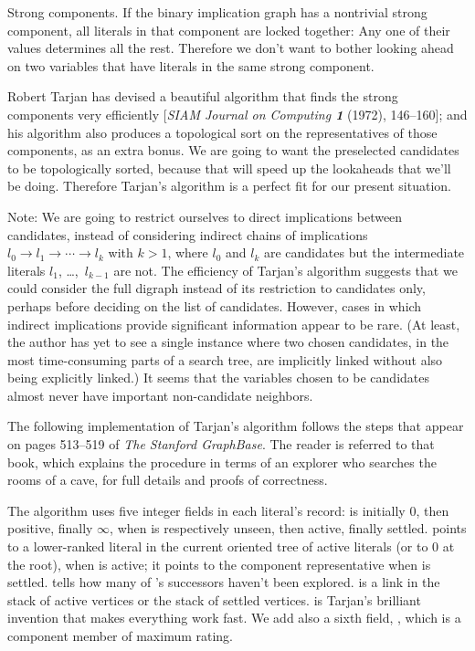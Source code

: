 Strong components. If the binary implication graph has
a nontrivial
strong component, all literals in that component are locked together:
Any one of their values determines all the rest. Therefore we don't want
to bother looking ahead on two variables that have literals in the
same strong component.

Robert Tarjan has devised a beautiful algorithm that finds the strong
components very efficiently [{\sl SIAM Journal on Computing\/ \bf1} (1972),
146--160]; and his algorithm also produces a topological sort on the
representatives of those components, as an extra bonus. We are going to want
the preselected candidates to be topologically sorted, because that will speed
up the lookaheads that we'll be doing. Therefore Tarjan's algorithm
is a perfect fit for our present situation.

Note: We are going to restrict ourselves to direct implications between
candidates, instead of considering indirect chains of implications
$l_0\to l_1\to \cdots\to l_k$ with $k>1$,
where $l_0$ and $l_k$ are candidates but the intermediate literals
$l_1$, \dots,~$l_{k-1}$ are not. The efficiency of Tarjan's algorithm
suggests that we could consider the full digraph instead of its
restriction to candidates only, perhaps before deciding on the
list of candidates. However, cases in which indirect implications provide
significant information appear to be rare. (At least, the author has yet
to see a single instance where two chosen candidates, in the most
time-consuming parts of a search tree, are implicitly linked without
also being explicitly linked.) It seems that the variables chosen to
be candidates almost never have important non-candidate neighbors.

The following implementation of Tarjan's algorithm follows the
steps that appear on pages 513--519 of {\sl The Stanford GraphBase}.
The reader is referred to that book, which explains the procedure in terms of
an explorer who searches the rooms of a cave, for full details and proofs of
correctness.

The algorithm uses five integer fields in each literal's  record:
\smallskip
{} is initially 0, then positive, finally $\infty$, when  is
respectively unseen, then active, finally settled.
\smallskip
{} points to a lower-ranked literal in the current oriented tree
of
active literals (or to 0 at the root), when  is active; it points
to the component representative when  is settled.
\smallskip
{} tells how many of 's successors haven't been
explored.
\smallskip
{} is a link in the stack of active vertices or the stack of settled
vertices.
\smallskip
{} is Tarjan's brilliant invention that makes everything work fast.
\smallskip\noindent
We add also a sixth field, , which is a component member
of maximum rating.

